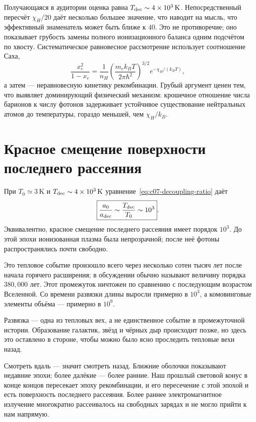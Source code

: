 Получающаяся в аудитории оценка равна \(T_{\rm dec}\sim4\times10^3\,\mathrm{K}\). Непосредственный пересчёт \(\chi_H/20\) даёт несколько большее значение, что наводит на мысль, что эффективный знаменатель может быть ближе к \(40\). Это не противоречие; оно показывает грубость замены полного ионизационного баланса одним подсчётом по хвосту. Систематическое равновесное рассмотрение использует соотношение Саха,
\begin{equation}
\frac{x_e^2}{1-x_e}
=
\frac{1}{n_H}
\left(\frac{m_e k_BT}{2\pi\hbar^2}\right)^{3/2}
e^{-\chi_H/(k_BT)},
\label{eq:c07-saha}
\end{equation}
а затем — неравновесную кинетику рекомбинации. Грубый аргумент ценен тем, что выявляет доминирующий физический механизм: крошечное отношение числа барионов к числу фотонов задерживает устойчивое существование нейтральных атомов до температуры, гораздо меньшей, чем \(\chi_H/k_B\).

\section{Красное смещение поверхности последнего рассеяния}

При \(T_0\simeq3\,\mathrm{K}\) и \(T_{\rm dec}\sim4\times10^3\,\mathrm{K}\) уравнение~\eqref{eq:c07-decoupling-ratio} даёт
\begin{equation}
\boxed{
\frac{a_0}{a_{\rm dec}}
\sim
\frac{T_{\rm dec}}{T_0}
\sim10^3
}.
\label{eq:c07-decoupling-expansion}
\end{equation}
Эквивалентно, красное смещение последнего рассеяния имеет порядок \(10^3\). До этой эпохи ионизованная плазма была непрозрачной; после неё фотоны распространялись почти свободно.

Это тепловое событие произошло всего через несколько сотен тысяч лет после начала горячего расширения; в обсуждении обычно называют величину порядка \(380{,}000\) лет. Этот промежуток ничтожен по сравнению с последующим возрастом Вселенной. Со времени развязки длины выросли примерно в \(10^3\), а комовинговые элементы объёма — примерно в \(10^9\).

Развязка — одна из тепловых вех, а не единственное событие в промежуточной истории. Образование галактик, звёзд и чёрных дыр происходит позже, но здесь это оставлено в стороне, чтобы можно было ясно проследить тепловые вехи назад.

Смотреть вдаль — значит смотреть назад. Ближние оболочки показывают недавние эпохи; более далёкие — более ранние. Наш прошлый световой конус в конце концов пересекает эпоху рекомбинации, и его пересечение с этой эпохой и есть поверхность последнего рассеяния. Более раннее электромагнитное излучение многократно рассеивалось на свободных зарядах и не могло прийти к нам напрямую.

